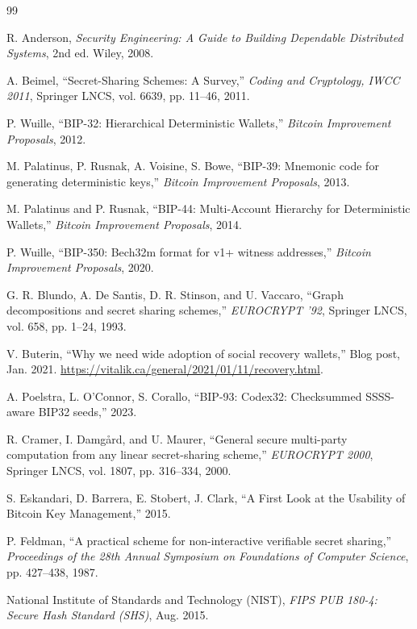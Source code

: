 \documentclass[11pt]{article}
\begin{document}
\begin{thebibliography}{99}

R. Anderson,
\textit{Security Engineering: A Guide to Building Dependable Distributed Systems}, 2nd ed.
Wiley, 2008.

A. Beimel,
``Secret-Sharing Schemes: A Survey,''
\textit{Coding and Cryptology, IWCC 2011}, Springer LNCS, vol. 6639, pp. 11--46, 2011.

P. Wuille,
``BIP-32: Hierarchical Deterministic Wallets,''
\textit{Bitcoin Improvement Proposals}, 2012.

M. Palatinus, P. Rusnak, A. Voisine, S. Bowe,
``BIP-39: Mnemonic code for generating deterministic keys,''
\textit{Bitcoin Improvement Proposals}, 2013.

M. Palatinus and P. Rusnak,
``BIP-44: Multi-Account Hierarchy for Deterministic Wallets,''
\textit{Bitcoin Improvement Proposals}, 2014.

P. Wuille,
``BIP-350: Bech32m format for v1+ witness addresses,''
\textit{Bitcoin Improvement Proposals}, 2020.

G. R. Blundo, A. De Santis, D. R. Stinson, and U. Vaccaro,
``Graph decompositions and secret sharing schemes,''
\textit{EUROCRYPT '92}, Springer LNCS, vol. 658, pp. 1--24, 1993.

V. Buterin,
``Why we need wide adoption of social recovery wallets,''
Blog post, Jan. 2021. \url{https://vitalik.ca/general/2021/01/11/recovery.html}.

A. Poelstra, L. O'Connor, S. Corallo,
``BIP-93: Codex32: Checksummed SSSS-aware BIP32 seeds,'' 2023.

R. Cramer, I. Damgård, and U. Maurer,
``General secure multi-party computation from any linear secret-sharing scheme,''
\textit{EUROCRYPT 2000}, Springer LNCS, vol. 1807, pp. 316--334, 2000.

S. Eskandari, D. Barrera, E. Stobert, J. Clark,
``A First Look at the Usability of Bitcoin Key Management,'' 2015.

P. Feldman,
``A practical scheme for non-interactive verifiable secret sharing,''
\textit{Proceedings of the 28th Annual Symposium on Foundations of Computer Science}, pp. 427--438, 1987.

National Institute of Standards and Technology (NIST),
\textit{FIPS PUB 180-4: Secure Hash Standard (SHS)}, Aug. 2015.


\end{thebibliography}
\end{document}
